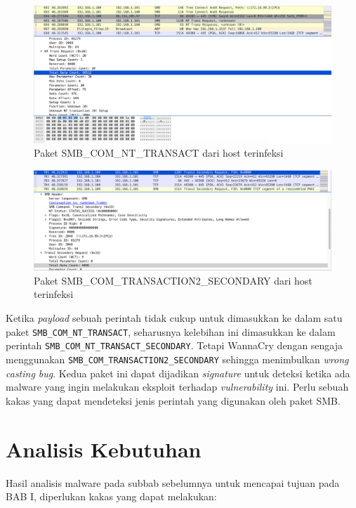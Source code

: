 \begin{figure}[H]
	\centering
	\includegraphics[width=\textwidth]{resources/trans_nop.png}
	\caption{Paket SMB\_COM\_NT\_TRANSACT dari host terinfeksi}
	\label{fig:trans_nop}
\end{figure}
\begin{figure}[H]
	\centering
	\includegraphics[width=\textwidth]{resources/trans2_secondary.png}
	\caption{Paket SMB\_COM\_TRANSACTION2\_SECONDARY dari host terinfeksi}
	\label{fig:trans2_secondary}
\end{figure}

Ketika \textit{payload} sebuah perintah tidak cukup untuk dimasukkan ke dalam satu paket \verb|SMB_COM_NT_TRANSACT|, seharusnya kelebihan ini dimasukkan ke dalam perintah \verb|SMB_COM_NT_TRANSACT_SECONDARY|. Tetapi WannaCry dengan sengaja menggunakan \verb|SMB_COM_TRANSACTION2_SECONDARY| sehingga menimbulkan \textit{wrong casting bug}. Kedua paket ini dapat dijadikan \textit{signature} untuk deteksi ketika ada malware yang ingin melakukan eksploit terhadap \textit{vulnerability} ini. Perlu sebuah kakas yang dapat mendeteksi jenis perintah yang digunakan oleh paket SMB.


\section{Analisis Kebutuhan}

Hasil analisis malware pada subbab sebelumnya untuk mencapai tujuan pada BAB I, diperlukan kakas yang dapat melakukan:

